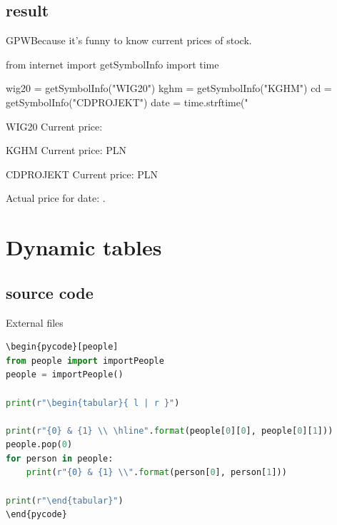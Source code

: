 \documentclass[
aspectratio=1610,
hyperref={pdfpagemode=FullScreen},
english,
usenames,
dvipsnames
]
{beamer} %
\begin{document}
\subsection{result}
\begin{frame}[fragile]{GPW}{Because it's funny to know current prices of stock.}
\begin{pycode}[internet]
from internet import getSymbolInfo
import time

wig20 = getSymbolInfo("WIG20")
kghm = getSymbolInfo("KGHM")
cd = getSymbolInfo("CDPROJEKT")
date = time.strftime("%
\end{pycode}


\begin{exampleblock}{WIG20}
Current price: 
\end{exampleblock}

\begin{exampleblock}{KGHM}
Current price:  PLN
\end{exampleblock}

\begin{exampleblock}{CDPROJEKT}
Current price:  PLN
\end{exampleblock}

Actual price for date: .

\onslide
\end{frame}

\section{Dynamic tables}
\subsection{source code}
\begin{frame}[fragile]{External files}
\begin{lstlisting}[language=python]
\begin{pycode}[people]
from people import importPeople
people = importPeople()	

print(r"\begin{tabular}{ l | r }")

print(r"{0} & {1} \\ \hline".format(people[0][0], people[0][1]))
people.pop(0)
for person in people:
	print(r"{0} & {1} \\".format(person[0], person[1]))
	
print(r"\end{tabular}")
\end{pycode}

\end{lstlisting}
\end{frame}
\end{document}

